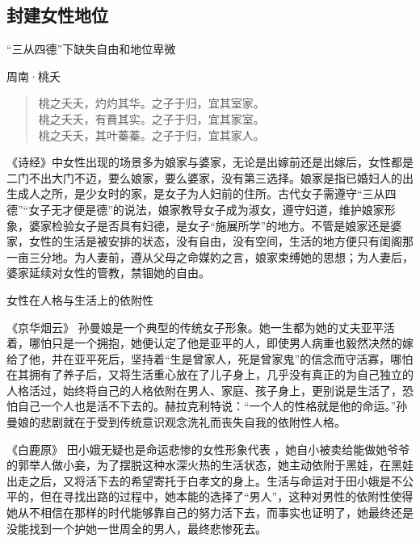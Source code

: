\subsection{封建女性地位}
\begin{frame}{“三从四德”下缺失自由和地位卑微}
    \begin{block}{周南·桃夭}
        \begin{verse}
            桃之夭夭，灼灼其华。之子于归，宜其室家。 \\
            桃之夭夭，有蕡其实。之子于归，宜其家室。 \\
            桃之夭夭，其叶蓁蓁。之子于归，宜其家人。 \\
        \end{verse}
    \end{block}
    \begin{block}{}
        《诗经》中女性出现的场景多为娘家与婆家，无论是出嫁前还是出嫁后，女性都是二门不出大门不迈，要么娘家，要么婆家，没有第三选择。娘家是指已婚妇人的出生成人之所，是少女时的家，是女子为人妇前的住所。古代女子需遵守“三从四德”“女子无才便是德”的说法，娘家教导女子成为淑女，遵守妇道，维护娘家形象，婆家检验女子是否具有妇德，是女子“施展所学”的地方。不管是娘家还是婆家，女性的生活是被安排的状态，没有自由，没有空间，生活的地方便只有闺阁那一亩三分地。为人妻前，遵从父母之命媒妁之言，娘家束缚她的思想；为人妻后，婆家延续对女性的管教，禁锢她的自由。
    \end{block}
\end{frame}

\begin{frame}{女性在人格与生活上的依附性}
    \begin{block}{《京华烟云》}
        \small
        孙曼娘是一个典型的传统女子形象。她一生都为她的丈夫亚平活着，哪怕只是一个拥抱，她便认定了他是亚平的人，即使男人病重也毅然决然的嫁给了他，并在亚平死后，坚持着“生是曾家人，死是曾家鬼”的信念而守活寡，哪怕在其拥有了养子后，又将生活重心放在了儿子身上，几乎没有真正的为自己独立的人格活过，始终将自己的人格依附在男人、家庭、孩子身上，更别说是生活了，恐怕自己一个人也是活不下去的。赫拉克利特说：“一个人的性格就是他的命运。”孙曼娘的悲剧就在于受到传统意识观念洗礼而丧失自我的依附性人格。
    \end{block}
    \begin{block}{《白鹿原》}
        \small
        田小娥无疑也是命运悲惨的女性形象代表 ，她自小被卖给能做她爷爷的郭举人做小妾，为了摆脱这种水深火热的生活状态，她主动依附于黑娃，在黑娃出走之后，又将活下去的希望寄托于白孝文的身上。生活与命运对于田小娥是不公平的，但在寻找出路的过程中，她本能的选择了“男人”，这种对男性的依附性使得她从不相信在那样的时代能够靠自己的努力活下去，而事实也证明了，她最终还是没能找到一个护她一世周全的男人，最终悲惨死去。
    \end{block}
\end{frame}



